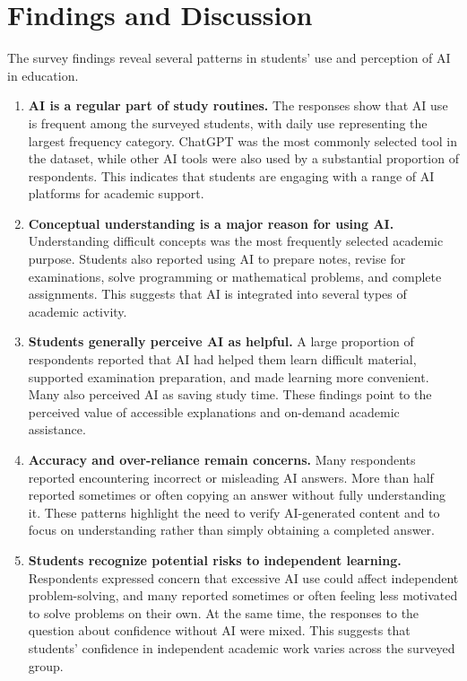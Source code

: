\documentclass[12pt,a4paper]{article}
\begin{document}
\section{Findings and Discussion}
\label{sec:findings-discussion}

The survey findings reveal several patterns in students' use and perception of AI in education.

\begin{enumerate}
    \item \textbf{AI is a regular part of study routines.}
    The responses show that AI use is frequent among the surveyed students, with daily use representing the largest frequency category. ChatGPT was the most commonly selected tool in the dataset, while other AI tools were also used by a substantial proportion of respondents. This indicates that students are engaging with a range of AI platforms for academic support.

    \item \textbf{Conceptual understanding is a major reason for using AI.}
    Understanding difficult concepts was the most frequently selected academic purpose. Students also reported using AI to prepare notes, revise for examinations, solve programming or mathematical problems, and complete assignments. This suggests that AI is integrated into several types of academic activity.

    \item \textbf{Students generally perceive AI as helpful.}
    A large proportion of respondents reported that AI had helped them learn difficult material, supported examination preparation, and made learning more convenient. Many also perceived AI as saving study time. These findings point to the perceived value of accessible explanations and on-demand academic assistance.

    \item \textbf{Accuracy and over-reliance remain concerns.}
    Many respondents reported encountering incorrect or misleading AI answers. More than half reported sometimes or often copying an answer without fully understanding it. These patterns highlight the need to verify AI-generated content and to focus on understanding rather than simply obtaining a completed answer.

    \item \textbf{Students recognize potential risks to independent learning.}
    Respondents expressed concern that excessive AI use could affect independent problem-solving, and many reported sometimes or often feeling less motivated to solve problems on their own. At the same time, the responses to the question about confidence without AI were mixed. This suggests that students' confidence in independent academic work varies across the surveyed group.


\end{enumerate}
\end{document}
